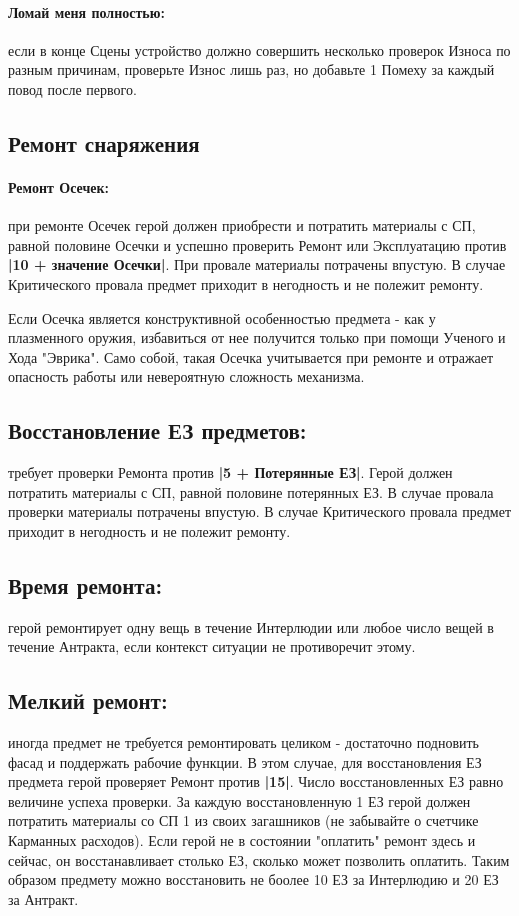 \paragraph{Ломай меня полностью:} если в конце Сцены устройство должно совершить несколько проверок Износа по разным причинам, проверьте Износ лишь раз, но добавьте 1 Помеху за каждый повод после первого. 

\subsection{Ремонт снаряжения}
\paragraph{Ремонт Осечек:} при ремонте Осечек герой должен приобрести и потратить материалы с СП, равной половине Осечки и успешно проверить Ремонт или Эксплуатацию против \textbf{|10 + значение Осечки|}. При провале материалы потрачены впустую. В случае Критического провала предмет приходит в негодность и  не полежит ремонту. 
\begin{tcolorbox}
    Если Осечка является конструктивной особенностью предмета - как у плазменного оружия, избавиться от нее получится только при помощи Ученого и Хода "Эврика". Само собой, такая Осечка учитывается при ремонте и отражает опасность работы или невероятную сложность механизма.
\end{tcolorbox}

\subsection{Восстановление ЕЗ предметов:} требует проверки Ремонта против \textbf{|5 + Потерянные ЕЗ|}. Герой должен потратить материалы с СП, равной половине потерянных ЕЗ. В случае провала проверки материалы потрачены впустую. В случае Критического провала предмет приходит в негодность и не полежит ремонту.
\subsection{Время ремонта:} герой ремонтирует одну вещь в течение Интерлюдии или любое число вещей в течение Антракта, если контекст ситуации не противоречит этому. 

\subsection{Мелкий ремонт:} иногда предмет не требуется ремонтировать целиком - достаточно подновить фасад и поддержать рабочие функции. В этом случае, для восстановления ЕЗ предмета герой проверяет Ремонт против \textbf{|15|}. Число восстановленных ЕЗ равно величине успеха проверки. За каждую восстановленную 1 ЕЗ герой должен потратить материалы со СП 1 из своих загашников (не забывайте о счетчике Карманных расходов). Если герой не в состоянии "оплатить" ремонт здесь и сейчас, он восстанавливает столько ЕЗ, сколько может позволить оплатить. Таким образом предмету можно восстановить не боолее 10 ЕЗ за Интерлюдию и 20 ЕЗ за Антракт.
